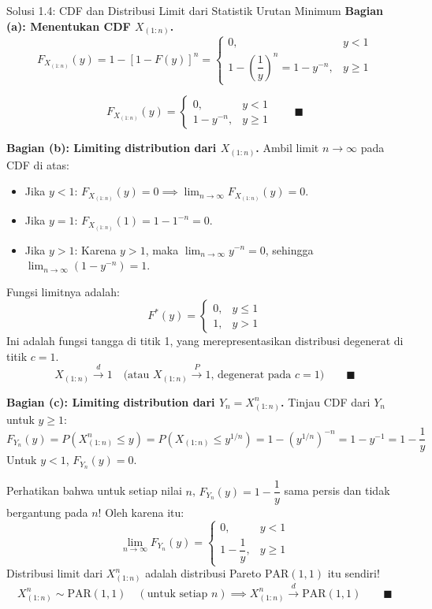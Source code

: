 \documentclass[10pt,twoside]{article}
\begin{document}
\begin{solbox}{Solusi 1.4: CDF dan Distribusi Limit dari Statistik Urutan Minimum}
\textbf{Bagian (a): Menentukan CDF $X_{(1:n)}$.}
\[
F_{X_{(1:n)}}(y) = 1 - [1 - F(y)]^n = \begin{cases} 0, & y < 1 \\ 1 - \left(\dfrac{1}{y}\right)^n = 1 - y^{-n}, & y \ge 1 \end{cases}
\]

\[
\boxed{F_{X_{(1:n)}}(y) = \begin{cases} 0, & y < 1 \\ 1 - y^{-n}, & y \ge 1 \end{cases}} \qquad \blacksquare
\]

\textbf{Bagian (b): Limiting distribution dari $X_{(1:n)}$.}
Ambil limit $n \to \infty$ pada CDF di atas:
\begin{itemize}
  \item Jika $y < 1$: $F_{X_{(1:n)}}(y) = 0 \implies \lim_{n \to \infty} F_{X_{(1:n)}}(y) = 0$.
  \item Jika $y = 1$: $F_{X_{(1:n)}}(1) = 1 - 1^{-n} = 0$.
  \item Jika $y > 1$: Karena $y > 1$, maka $\lim_{n \to \infty} y^{-n} = 0$, sehingga $\lim_{n \to \infty} (1 - y^{-n}) = 1$.
\end{itemize}
Fungsi limitnya adalah:
\[
F^*(y) = \begin{cases} 0, & y \le 1 \\ 1, & y > 1 \end{cases}
\]
Ini adalah fungsi tangga di titik 1, yang merepresentasikan distribusi degenerat di titik $c = 1$.
\[
\boxed{X_{(1:n)} \xrightarrow{d} 1 \quad \text{(atau } X_{(1:n)} \xrightarrow{P} 1 \text{, degenerat pada } c = 1\text{)}} \qquad \blacksquare
\]

\textbf{Bagian (c): Limiting distribution dari $Y_n = X_{(1:n)}^n$.}
Tinjau CDF dari $Y_n$ untuk $y \ge 1$:
\[
F_{Y_n}(y) = P(X_{(1:n)}^n \le y) = P(X_{(1:n)} \le y^{1/n}) = 1 - \left(y^{1/n}\right)^{-n} = 1 - y^{-1} = 1 - \frac{1}{y}
\]
Untuk $y < 1$, $F_{Y_n}(y) = 0$.

Perhatikan bahwa untuk setiap nilai $n$, $F_{Y_n}(y) = 1 - \dfrac{1}{y}$ sama persis dan tidak bergantung pada $n$!
Oleh karena itu:
\[
\lim_{n \to \infty} F_{Y_n}(y) = \begin{cases} 0, & y < 1 \\ 1 - \dfrac{1}{y}, & y \ge 1 \end{cases}
\]
Distribusi limit dari $X_{(1:n)}^n$ adalah distribusi Pareto $\text{PAR}(1, 1)$ itu sendiri!
\[
\boxed{X_{(1:n)}^n \sim \text{PAR}(1, 1) \quad (\text{untuk setiap } n) \implies X_{(1:n)}^n \xrightarrow{d} \text{PAR}(1, 1)} \qquad \blacksquare
\]
\end{solbox}
\end{document}
